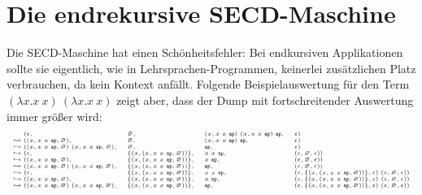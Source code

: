
\section{Die endrekursive SECD-Maschine}

Die SECD-Maschine hat einen Schönheitsfehler: Bei endkursiven
Applikationen sollte sie eigentlich, wie in Lehrsprachen-Programmen, keinerlei
zusätzlichen Platz verbrauchen, da kein Kontext anfällt.  Folgende
Beispielauswertung für den Term $(\lambda x.x~x)~(\lambda x.x~x)$
zeigt aber, dass der Dump mit fortschreitender Auswertung immer
größer wird:
%
\begin{displaymath}\tiny
  \begin{array}{l@{}llll}
&(\epsilon, &\varnothing, &(x, x~x~\mathtt{ap})~(x, x~x~\mathtt{ap})~\mathtt{ap}, &\epsilon)\\
\hookrightarrow{}&((x, x~x~\mathtt{ap}, \varnothing), &\varnothing, &(x, x~x~\mathtt{ap})~\mathtt{ap}, &\epsilon)\\
\hookrightarrow{}&((x, x~x~\mathtt{ap}, \varnothing)~(x, x~x~\mathtt{ap}, \varnothing), &\varnothing, &\mathtt{ap}, &\epsilon)\\
\hookrightarrow{}&(\epsilon, &\{(x, (x, x~x~\mathtt{ap}, \varnothing))\}, &x~x~\mathtt{ap}, &(\epsilon, \varnothing, \epsilon))\\
\hookrightarrow{}&((x, x~x~\mathtt{ap}, \varnothing), &\{(x, (x, x~x~\mathtt{ap}, \varnothing))\}, &x~\mathtt{ap}, &(\epsilon, \varnothing, \epsilon))\\
\hookrightarrow{}&((x, x~x~\mathtt{ap}, \varnothing)~(x, x~x~\mathtt{ap}, \varnothing), &\{(x, (x, x~x~\mathtt{ap}, \varnothing))\}, &\mathtt{ap}, &(\epsilon, \varnothing, \epsilon))\\
\hookrightarrow{}&(\epsilon, &\{(x, (x, x~x~\mathtt{ap}, \varnothing))\}, &x~x~\mathtt{ap}, &(\epsilon, \{(x, (x, x~x~\mathtt{ap}, \varnothing))\}, \epsilon)~(\epsilon, \varnothing, \epsilon))\\
\hookrightarrow{}&((x, x~x~\mathtt{ap}, \varnothing), &\{(x, (x, x~x~\mathtt{ap}, \varnothing))\}, &x~\mathtt{ap}, &(\epsilon, \{(x, (x, x~x~\mathtt{ap}, \varnothing))\}, \epsilon)~(\epsilon, \varnothing, \epsilon))\\
\hookrightarrow{}&((x, x~x~\mathtt{ap}, \varnothing)~(x, x~x~\mathtt{ap}, \varnothing), &\{(x, (x, x~x~\mathtt{ap}, \varnothing))\}, &\mathtt{ap}, &(\epsilon, \{(x, (x, x~x~\mathtt{ap}, \varnothing))\}, \epsilon)~(\epsilon, \varnothing, \epsilon))\\

\end{array}
\end{displaymath}
